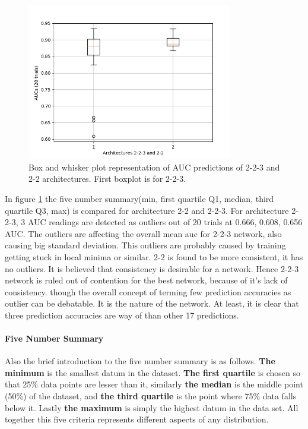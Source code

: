 \begin{figure}[htp]
\centering
\includegraphics[width=9cm]{images/densenet/arch_compare_boxplot.png}
\caption{Box and whisker plot representation of AUC predictions of 2-2-3 and 2-2 architectures. First boxplot is for 2-2-3.}
\label{fig:arch_compare_boxplot}
\end{figure}

In figure \ref{fig:arch_compare_boxplot} the five number summary(min, first quartile Q1, median, third quartile Q3, max) is compared for architecture 2-2 and 2-2-3. For architecture 2-2-3, 3 AUC readings are detected as outliers 
out of 20 trials at 0.666, 0.608, 0.656 AUC. The outliers are affecting the overall mean auc for 2-2-3 network, also causing big standard deviation. This outliers are probably caused by training getting stuck in local minima or similar. 
2-2 is found to be more consistent, it has no outliers. It is believed that consistency is desirable for a network. Hence 2-2-3 network is ruled out of contention for the best network, because of it's lack of consistency.
though the overall concept of terming few prediction accuracies as outlier can be debatable. It is the nature of the network. At least, it is clear that three prediction accuracies are way of than other 17 predictions.

\paragraph{Five Number Summary\\}
Also the brief introduction to the five number summary is as follows. \textbf{The minimum} is the smallest datum in the dataset. \textbf{The first quartile} is chosen so that 25\% data points are lesser than it, similarly \textbf{the median}
is the middle point (50\%) of the dataset, and \textbf{the third quartile} is the point where 75\% data falls below it. Lastly \textbf{the maximum} is simply the highest datum in the data set. All together this five criteria 
represents different aspects of any distribution.

